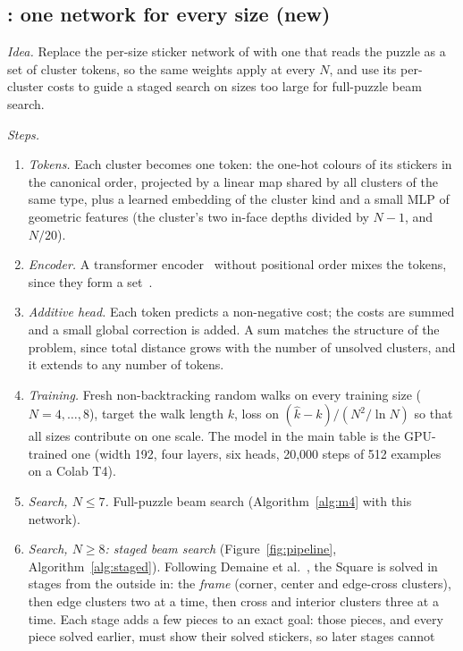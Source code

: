 \subsection{\FiveA: one network for every size (new)}
\label{sec:5a}

\emph{Idea.} Replace the per-size sticker network of \Mfour with one that reads the puzzle as a set of cluster tokens, so the same
weights apply at every $N$, and use its per-cluster costs to guide a staged search on sizes too large for full-puzzle beam search.

\emph{Steps.}
\begin{enumerate}
\item \emph{Tokens.} Each cluster becomes one token: the one-hot colours of its stickers in the canonical order, projected by a
  linear map shared by all clusters of the same type, plus a learned embedding of the cluster kind and a small MLP of geometric
  features (the cluster's two in-face depths divided by $N-1$, and $N/20$).
\item \emph{Encoder.} A transformer encoder~\cite{vaswani2017attention} without positional order mixes the tokens, since they form a
  set~\cite{lee2019settransformer}.
\item \emph{Additive head.} Each token predicts a non-negative cost; the costs are summed and a small global correction is added. A sum
  matches the structure of the problem, since total distance grows with the number of unsolved clusters, and it extends to any
  number of tokens.
\item \emph{Training.} Fresh non-backtracking random walks on every training size ($N=4,\dots,8$), target the walk length $k$, loss on
  $(\hat k-k)/(N^2/\ln N)$ so that all sizes contribute on one scale. The model in the main table is the GPU-trained one (width 192,
  four layers, six heads, 20,000 steps of 512 examples on a Colab T4).
\item \emph{Search, $N\le7$.} Full-puzzle beam search (Algorithm~\ref{alg:m4} with this network).
\item \emph{Search, $N\ge8$: staged beam search} (Figure~\ref{fig:pipeline}, Algorithm~\ref{alg:staged}). Following Demaine et
  al.~\cite{demaine2011algorithms}, the Square is solved in stages from the outside in: the \emph{frame} (corner, center and
  edge-cross clusters), then edge clusters two at a time, then cross and interior clusters three at a time. Each stage adds a few
  pieces to an exact goal: those pieces, and every piece solved earlier, must show their solved stickers, so later stages cannot

\end{enumerate}
